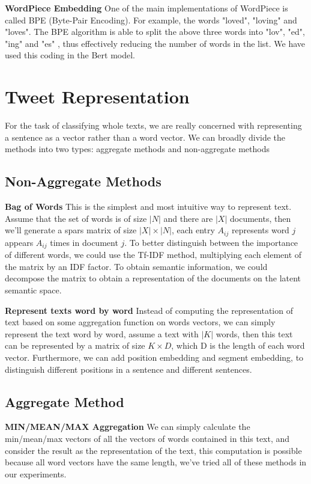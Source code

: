 \documentclass[journal]{IEEEtran}
\begin{document}
\textbf{WordPiece Embedding} One of the main implementations of WordPiece is called BPE (Byte-Pair Encoding). For example, the words "loved", "loving" and "loves". The BPE algorithm is able to split the above three words into "lov", "ed", "ing" and "es" , thus effectively reducing the number of words in the list. We have used this coding in the Bert model.

\section{Tweet Representation}
For the task of classifying whole texts, we are really concerned with representing a sentence as a vector rather than a word vector. We can broadly divide the methods into two types: aggregate methods and non-aggregate methods
\subsection{Non-Aggregate Methods}
\textbf{Bag of Words} This is the simplest and most intuitive way to represent text. Assume that the set of words is of size $\lvert N \rvert$ and there are $\lvert X \rvert$ documents, then we'll generate a spars matrix of size $\lvert X \rvert \times \lvert N \rvert$, each entry $A_{ij}$ represents word $j$ appears $A_{ij}$ times in document $j$. To better distinguish between the importance of different words, we could use the Tf-IDF method, multiplying each element of the matrix by an IDF factor. To obtain semantic information, we could decompose the matrix to obtain a representation of the documents on the latent semantic space.

\textbf{Represent texts word by word} Instead of computing the representation of text based on some aggregation function on words vectors, we can simply represent the text word by word, assume a text with $\lvert K \rvert$ words, then this text can be represented by a matrix of size $K \times D$, which D is the length of each word vector. Furthermore, we can add position embedding and segment embedding, to distinguish different positions in a sentence and different sentences.

\subsection{Aggregate Method}
\textbf{MIN/MEAN/MAX Aggregation} We can simply calculate the min/mean/max vectors of all the vectors of words contained in this text, and consider the result as the representation of the text, this computation is possible because all word vectors have the same length, we've tried all of these methods in our experiments.
\end{document}
